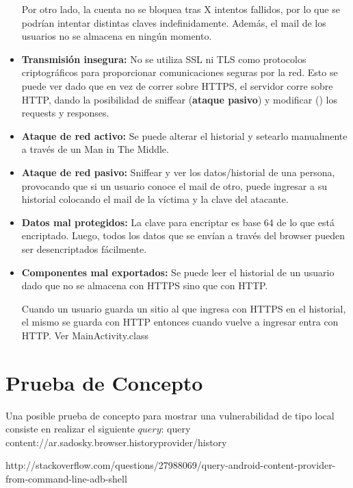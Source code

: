 \documentclass[10pt, a4paper]{article}
\begin{document}
\begin{itemize}
Por otro lado, la cuenta no se bloquea tras X intentos fallidos, por lo que se podrían intentar distintas claves indefinidamente. Además, el mail de los usuarios no se almacena en ningún momento. 

\item \textbf{Transmisión insegura:} No se utiliza SSL ni TLS como protocolos criptográficos para proporcionar comunicaciones seguras por la red. Esto se puede ver dado que en vez de correr sobre HTTPS, el servidor corre sobre HTTP, dando la posibilidad de sniffear (\textbf{ataque pasivo}) y modificar () los requests y responses.

\item \textbf{Ataque de red activo:} Se puede alterar el historial y setearlo manualmente a través de un Man in The Middle.

\item \textbf{Ataque de red pasivo:} Sniffear y ver los datos/historial de una persona, provocando que si un usuario conoce el mail de otro, puede ingresar a su historial colocando el mail de la víctima y la clave del atacante.

\item \textbf{Datos mal protegidos:} La clave para encriptar es base 64 de lo que está encriptado. Luego, todos los datos que se envían a través del browser pueden ser desencriptados fácilmente. 

\item \textbf{Componentes mal exportados:} Se puede leer el historial de un usuario dado que no se almacena con HTTPS sino que con HTTP.

Cuando un usuario guarda un sitio al que ingresa con HTTPS en el historial, el mismo se guarda con HTTP entonces cuando vuelve a ingresar entra con HTTP. Ver MainActivity.class

\end{itemize}

\newpage
\section{Prueba de Concepto}

Una posible prueba de concepto para mostrar una vulnerabilidad de tipo local consiste en realizar el siguiente $query$:
query content://ar.sadosky.browser.historyprovider/history

http://stackoverflow.com/questions/27988069/query-android-content-provider-from-command-line-adb-shell
\end{document}
